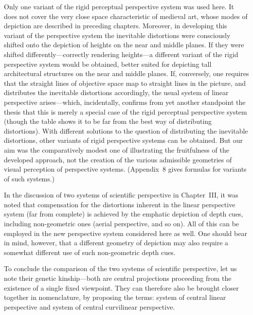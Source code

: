 Only one variant of the rigid perceptual perspective system was used here. It does
not cover the very close space characteristic of medieval art, whose modes of
depiction are described in preceding chapters. Moreover, in developing this variant
of the perspective system the inevitable distortions were consciously shifted onto
the depiction of heights on the near and middle planes. If they were shifted
differently---correctly rendering heights---a different variant of the rigid
perspective system would be obtained, better suited for depicting tall architectural
structures on the near and middle planes. If, conversely, one requires that the
straight lines of objective space map to straight lines in the picture, and
distributes the inevitable distortions accordingly, the usual system of linear
perspective arises---which, incidentally, confirms from yet another standpoint the
thesis that this is merely a special case of the rigid perceptual perspective
system (though the table shows it to be far from the best way of distributing
distortions). With different solutions to the question of distributing the inevitable
distortions, other variants of rigid perspective systems can be obtained. But our
aim was the comparatively modest one of illustrating the fruitfulness of the
developed approach, not the creation of the various admissible geometries of visual
perception of perspective systems. (Appendix~8 gives formulas for variants of such
systems.)


In the discussion of two systems of scientific perspective in Chapter~III, it was
noted that compensation for the distortions inherent in the linear perspective system
(far from complete) is achieved by the emphatic depiction of depth cues, including
non-geometric ones (aerial perspective, and so on). All of this can be employed in
the new perspective system considered here as well. One should bear in mind,
however, that a different geometry of depiction may also require a somewhat different
use of such non-geometric depth cues.

To conclude the comparison of the two systems of scientific perspective, let us note
their genetic kinship---both are central projections proceeding from the existence
of a single fixed viewpoint. They can therefore also be brought closer together in
nomenclature, by proposing the terms: system of central linear perspective and
system of central curvilinear perspective.

